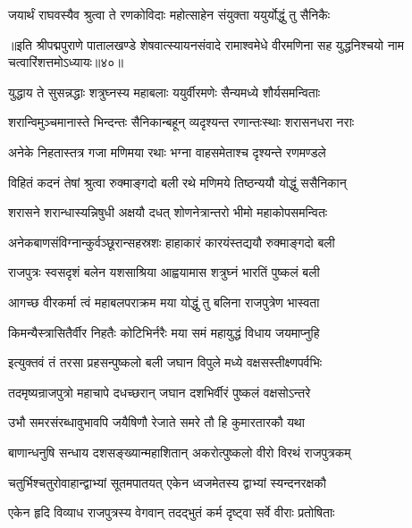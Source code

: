 \twolineshloka
{जयार्थं राघवस्यैव श्रुत्वा ते रणकोविदाः}
{महोत्साहेन संयुक्ता ययुर्योद्धुं तु सैनिकैः}%

{॥इति श्रीपद्मपुराणे पातालखण्डे शेषवात्स्यायनसंवादे रामाश्वमेधे वीरमणिना सह युद्धनिश्चयो नाम चत्वारिंशत्तमोऽध्यायः॥४०॥}

\resetShloka


\twolineshloka
{युद्धाय ते सुसन्नद्धाः शत्रुघ्नस्य महाबलाः}
{ययुर्वीरमणेः सैन्यमध्ये शौर्यसमन्विताः}%

\twolineshloka
{शरान्विमुञ्चमानास्ते भिन्दन्तः सैनिकान्बहून्}
{व्यदृश्यन्त रणान्तःस्थाः शरासनधरा नराः}%

\twolineshloka
{अनेके निहतास्तत्र गजा मणिमया रथाः}
{भग्ना वाहसमेताश्च दृश्यन्ते रणमण्डले}%

\twolineshloka
{विहितं कदनं तेषां श्रुत्वा रुक्माङ्गदो बली}
{रथे मणिमये तिष्ठन्ययौ योद्धुं ससैनिकान्}%

\twolineshloka
{शरासने शरान्धास्यन्निषुधी अक्षयौ दधत्}
{शोणनेत्रान्तरो भीमो महाकोपसमन्वितः}%

\twolineshloka
{अनेकबाणसंविग्नान्कुर्वञ्छूरान्सहस्रशः}
{हाहाकारं कारयंस्तद्ययौ रुक्माङ्गदो बली}%

\twolineshloka
{राजपुत्रः स्वसदृशं बलेन यशसाश्रिया}
{आह्वयामास शत्रुघ्नं भारतिं पुष्कलं बली}%


\twolineshloka
{आगच्छ वीरकर्मा त्वं महाबलपराक्रम}
{मया योद्धुं तु बलिना राजपुत्रेण भास्वता}%

\twolineshloka
{किमन्यैस्त्रासितैर्वीर निहतैः कोटिभिर्नरैः}
{मया समं महायुद्धं विधाय जयमाप्नुहि}%

\twolineshloka
{इत्युक्तवं तं तरसा प्रहसन्पुष्कलो बली}
{जघान विपुले मध्ये वक्षसस्तीक्ष्णपर्वभिः}%

\twolineshloka
{तदमृष्यन्राजपुत्रो महाचापे दधच्छरान्}
{जघान दशभिर्वीरं पुष्कलं वक्षसोऽन्तरे}%

\twolineshloka
{उभौ समरसंरब्धावुभावपि जयैषिणौ}
{रेजाते समरे तौ हि कुमारतारकौ यथा}%

\twolineshloka
{बाणान्धनुषि सन्धाय दशसङ्ख्यान्महाशितान्}
{अकरोत्पुष्कलो वीरो विरथं राजपुत्रकम्}%

\twolineshloka
{चतुर्भिश्चतुरोवाहान्द्वाभ्यां सूतमपातयत्}
{एकेन ध्वजमेतस्य द्वाभ्यां स्यन्दनरक्षकौ}%

\twolineshloka
{एकेन हृदि विव्याध राजपुत्रस्य वेगवान्}
{तदद्भुतं कर्म दृष्ट्वा सर्वे वीराः प्रतोषिताः}%

